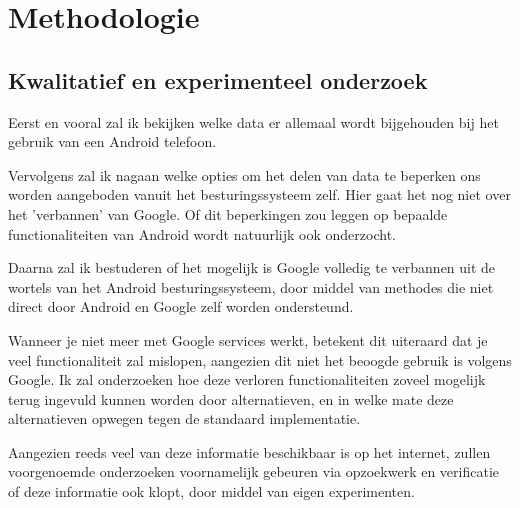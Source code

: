 \section{Methodologie}
\label{sec:methodologie}


\subsection{{Kwalitatief en experimenteel onderzoek}}


Eerst en vooral zal ik bekijken welke data er allemaal wordt bijgehouden bij het gebruik van een Android telefoon.

\vspace{3mm}

\noindent Vervolgens zal ik nagaan welke opties om het delen van data te beperken ons worden aangeboden vanuit het besturingssysteem zelf. Hier gaat het nog niet over het 'verbannen' van Google. Of dit beperkingen zou leggen op bepaalde functionaliteiten van Android wordt natuurlijk ook onderzocht.

\vspace{3mm}

\noindent Daarna zal ik bestuderen of het mogelijk is Google volledig te verbannen uit de wortels van het Android besturingssysteem, door middel van methodes die niet direct door Android en Google zelf worden ondersteund.

\vspace{3mm}

\noindent Wanneer je niet meer met Google services werkt, betekent dit uiteraard dat je veel functionaliteit zal mislopen, aangezien dit niet het beoogde gebruik is volgens Google. Ik zal onderzoeken hoe deze verloren functionaliteiten zoveel mogelijk terug ingevuld kunnen worden door alternatieven, en in welke mate deze alternatieven opwegen tegen de standaard implementatie.

\vspace{3mm}

\noindent Aangezien reeds veel van deze informatie beschikbaar is op het internet, zullen voorgenoemde onderzoeken voornamelijk gebeuren via opzoekwerk en verificatie of deze informatie ook klopt, door middel van eigen experimenten.

